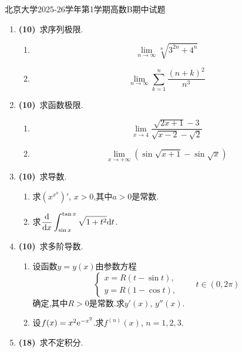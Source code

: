 \documentclass{ctexart}
\begin{document}
\pagestyle{empty}
\begin{center}\Large
北京大学2025-26学年第1学期高数B期中试题
\end{center}

\begin{enumerate}[leftmargin=*,label=\textbf{\arabic*.},topsep=0pt,parsep=0pt,itemsep=0pt,partopsep=0pt]
    \item \textbf{(10)}\ 求序列极限.
\begin{enumerate}[label=\tbf{(\alph*)},leftmargin=*,topsep=0pt,parsep=0pt,itemsep=0pt,partopsep=0pt]
\item \[\lim_{n\to\infty}\sqrt[n]{3^{2n}+4^n}\]
\item \[\lim_{n\to\infty}\sum_{k=1}^n\dfrac{(n+k)^2}{n^3}\]
\end{enumerate}
    \item \textbf{(10)}\ 求函数极限.
\begin{enumerate}[label=\tbf{(\alph*)},leftmargin=*,topsep=0pt,parsep=0pt,itemsep=0pt,partopsep=0pt]
\item \[\lim_{x\to4}\dfrac{\sqrt{2x+1}-3}{\sqrt{x-2}-\sqrt2}\]
\item \[\lim_{x\to+\infty}\left(\sin\sqrt{x+1}-\sin\sqrt x\right)\]
\end{enumerate}
    \item \textbf{(10)}\ 求导数.
\begin{enumerate}[label=\tbf{(\alph*)},leftmargin=*,topsep=0pt,parsep=0pt,itemsep=0pt,partopsep=0pt]
\item 求$\left(x^{x^a}\right)'$, $x>0$,其中$a>0$是常数.
\item 求$\displaystyle\dfrac{\mathrm{d}}{\mathrm{d} x}\int_{\sin x}^{\tan x}\sqrt{1+t^2}\mathrm{d} t$.
\end{enumerate}
    \item \textbf{(10)}\ 求多阶导数.
\begin{enumerate}[label=\tbf{(\alph*)},leftmargin=*,topsep=0pt,parsep=0pt,itemsep=0pt,partopsep=0pt]
\item 设函数$y=y(x)$由参数方程
\[\begin{cases}x=R(t-\sin t),\\ y=R(1-\cos t),\end{cases}\qquad t\in(0,2\pi)\]
确定,其中$R>0$是常数.求$y'(x)$, $y''(x)$.
\item 设$f(x)=x^2\mathrm{e}^{-x^2}$.求$f^{(n)}(x)$, $n=1,2,3$.
\end{enumerate}
    \item \textbf{(18)}\ 求不定积分.

\end{enumerate}
\end{document}
